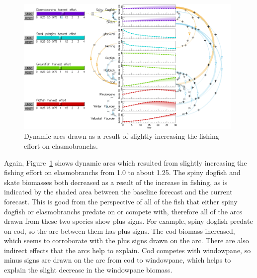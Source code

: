 \begin{figure}[h]
	\centering
	\includegraphics[width=0.98\textwidth]{figures/png/arcs_dynamic.png}
	\caption[Dynamic arcs drawn as a result of slightly increasing the fishing effort on elasmobranchs]{Dynamic arcs drawn as a result of slightly increasing the fishing effort on elasmobranchs.}
	\label{fig:arcs_dynamic}
\end{figure}

Again, Figure~\ref{fig:arcs_dynamic} shows dynamic arcs which resulted from slightly increasing the fishing effort on elasmobranchs from 1.0 to about 1.25.  The spiny dogfish and skate biomasses both decreased as a result of the increase in fishing, as is indicated by the shaded area between the baseline forecast and the current forecast.  This is good from the perspective of all of the fish that either spiny dogfish or elasmobranchs predate on or compete with, therefore all of the arcs drawn from these two species show plus signs.  For example, spiny dogfish predate on cod, so the arc between them has plus signs.  The cod biomass increased, which seems to corroborate with the plus signs drawn on the arc.  There are also indirect effects that the arcs help to explain.  Cod competes with windowpane, so minus signs are drawn on the arc from cod to windowpane, which helps to explain the slight decrease in the windowpane biomass.

